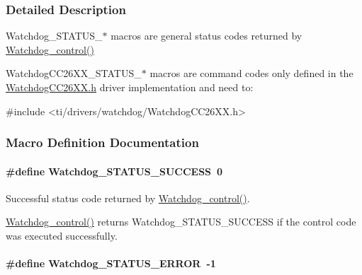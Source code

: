 \subsubsection{Detailed Description}
Watchdog\+\_\+\+S\+T\+A\+T\+U\+S\+\_\+$\ast$ macros are general status codes returned by \hyperlink{_watchdog_8h_aa98a75361edb1e476432669169f2950e}{Watchdog\+\_\+control()}

Watchdog\+C\+C26\+X\+X\+\_\+\+S\+T\+A\+T\+U\+S\+\_\+$\ast$ macros are command codes only defined in the \hyperlink{_watchdog_c_c26_x_x_8h}{Watchdog\+C\+C26\+X\+X.\+h} driver implementation and need to\+: 
\begin{DoxyCode}
\textcolor{preprocessor}{#include <ti/drivers/watchdog/WatchdogCC26XX.h>}
\end{DoxyCode}
 

\subsubsection{Macro Definition Documentation}
\paragraph[{Watchdog\+\_\+\+S\+T\+A\+T\+U\+S\+\_\+\+S\+U\+C\+C\+E\+S\+S}]{\setlength{\rightskip}{0pt plus 5cm}\#define Watchdog\+\_\+\+S\+T\+A\+T\+U\+S\+\_\+\+S\+U\+C\+C\+E\+S\+S~0}\label{group___watchdog___s_t_a_t_u_s_gaa8dd490de97398b1da33798d8e54b53f}


Successful status code returned by \hyperlink{_watchdog_8h_aa98a75361edb1e476432669169f2950e}{Watchdog\+\_\+control()}. 

\hyperlink{_watchdog_8h_aa98a75361edb1e476432669169f2950e}{Watchdog\+\_\+control()} returns Watchdog\+\_\+\+S\+T\+A\+T\+U\+S\+\_\+\+S\+U\+C\+C\+E\+S\+S if the control code was executed successfully. 
\paragraph[{Watchdog\+\_\+\+S\+T\+A\+T\+U\+S\+\_\+\+E\+R\+R\+O\+R}]{\setlength{\rightskip}{0pt plus 5cm}\#define Watchdog\+\_\+\+S\+T\+A\+T\+U\+S\+\_\+\+E\+R\+R\+O\+R~-\/1}\label{group___watchdog___s_t_a_t_u_s_ga7cc28c1119ebecae88a5ae0735228489}


